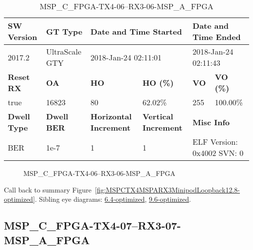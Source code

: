 \begin{table}[h]
\centering
\caption{MSP\_C\_FPGA-TX4-06--RX3-06-MSP\_A\_FPGA}
\label{tab:MSPCFPGATX406RX306MSPAFPGA12.8-optimized}
\begin{tabular}{@{}|l|l|l|l|l|l|@{}}
\toprule
\textbf{SW Version}                & \textbf{GT Type}   & \multicolumn{2}{l|}{\textbf{Date and Time Started}}            & \multicolumn{2}{l|}{\textbf{Date and Time Ended}}        \\ \midrule
2017.2                       & UltraScale GTY          & \multicolumn{2}{l|}{2018-Jan-24 02:11:01}                   & \multicolumn{2}{l|}{2018-Jan-24 02:11:43}               \\ \midrule
\textbf{Reset RX}                  & \textbf{OA} & \textbf{HO}   & \textbf{HO (\%)} & \textbf{VO} & \textbf{VO (\%)} \\ \midrule
true & 16823        & 80          & 62.02\%        & 255        & 100.00\%       \\ \midrule
\textbf{Dwell Type}                & \textbf{Dwell BER} & \textbf{Horizontal Increment} & \textbf{Vertical Increment}    & \multicolumn{2}{l|}{\textbf{Misc Info}}                  \\ \midrule
BER                            & 1e-7        & 1        & 1           & \multicolumn{2}{l|}{ELF Version: 0x4002 SVN: 0}                         \\ \bottomrule
\end{tabular}
\end{table}

\begin{figure}[h]
\caption{MSP\_C\_FPGA-TX4-06--RX3-06-MSP\_A\_FPGA} \label{fig:MSPCFPGATX406RX306MSPAFPGA12.8-optimized}
\end{figure}

Call back to summary Figure~\ref{fig:MSPCTX4MSPARX3MinipodLoopback12.8-optimized}.
Sibling eye diagrams: \hyperref[sec:MSPCFPGATX406RX306MSPAFPGA6.4-optimized]{6.4-optimized}, \hyperref[sec:MSPCFPGATX406RX306MSPAFPGA9.6-optimized]{9.6-optimized}.

\clearpage
\newpage


\subsection{MSP\_C\_FPGA-TX4-07--RX3-07-MSP\_A\_FPGA}\label{sec:MSPCFPGATX407RX307MSPAFPGA12.8-optimized}


